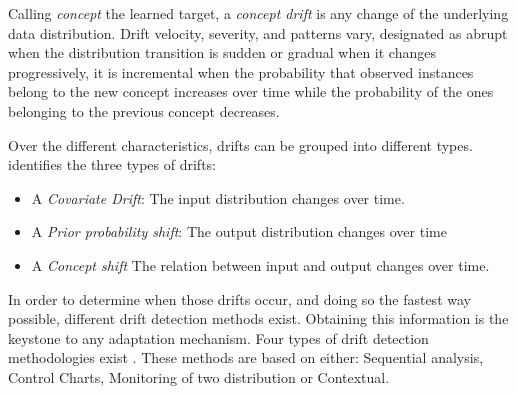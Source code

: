 \documentclass[runningheads]{llncs}
\begin{document}
    Calling \emph{concept} the learned target, a \emph{concept drift} is any change of the underlying data distribution. 
    Drift velocity, severity, and patterns vary, designated as abrupt when the distribution transition is sudden or gradual when it changes progressively, it is incremental when the probability that observed instances belong to the new concept increases over time while the probability of the ones belonging to the previous concept decreases. 
        
        
    Over the different characteristics, drifts can be grouped into different types. \cite{souza_challenges_2020} identifies the three types of drifts:
    \begin{itemize}
    \item A \emph{Covariate Drift}: The input distribution changes over time. 
    \item A \emph{Prior probability shift}: The output distribution changes over time
    \item A \emph{Concept shift} The relation between input and output changes over time.
    \end{itemize}

    
    
    In order to determine when those drifts occur, and doing so the fastest way possible, different drift detection methods exist. 
    Obtaining this information is the keystone to any adaptation mechanism.
    Four types of drift detection methodologies exist \cite{gama_survey_2014}.
    These methods are based on either: Sequential analysis, Control Charts, Monitoring of two distribution or Contextual.
    
\end{document}
